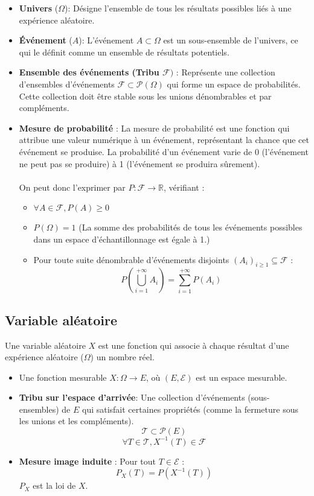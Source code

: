 \documentclass{article}
\begin{document}
\begin{itemize}
    \item \textbf{Univers} ($\Omega$): Désigne l'ensemble de tous les résultats possibles liés à une expérience aléatoire.
    \item \textbf{Événement} ($A$): L'événement $A \subset \Omega $ est un sous-ensemble de l'univers, ce qui le définit comme un ensemble de résultats potentiels.
    \item \textbf{Ensemble des événements (Tribu $\mathcal{F})$} : Représente une collection d'ensembles d'événements $ \mathcal{F} \subset \mathcal{P}(\Omega) $ qui forme un espace de probabilités. Cette collection doit être stable sous les unions dénombrables et par compléments.
    \item \textbf{Mesure de probabilité} : La mesure de probabilité est une fonction qui attribue une valeur numérique à un événement, représentant la chance que cet événement se produise. La probabilité d'un événement varie de 0 (l'événement ne peut pas se produire) à 1 (l'événement se produira sûrement). \\ \\
    On peut donc l'exprimer par $P : \mathcal{F} \rightarrow \mathbb{R}$, vérifiant :
    \begin{itemize}
        \item $ \forall A \in \mathcal{F}, P(A) \geq 0 $
        \item $P(\Omega) = 1$ (La somme des probabilités de tous les événements possibles dans un espace d'échantillonnage est égale à 1.)
        \item Pour toute suite dénombrable d'événements disjoints $(A_i)_{i \geq 1} \subseteq \mathcal{F}$ :
        \[
        P\left( \bigcup_{i=1}^{+\infty} A_i \right) = \sum_{i=1}^{+\infty} P(A_i)
        \]
    \end{itemize}
\end{itemize}

\subsection{Variable aléatoire}

Une variable aléatoire $ X $ est une fonction qui associe à chaque résultat d'une expérience aléatoire ($\Omega$) un nombre réel.

\begin{itemize}
    \item Une fonction mesurable $X : \Omega \rightarrow E$, où $(E, \mathcal{E})$ est un espace mesurable.
    \item \textbf{Tribu sur l'espace d'arrivée}: Une collection d'événements (sous-ensembles) de $E$ qui satisfait certaines propriétés (comme la fermeture sous les unions et les compléments). 
    \[
    \mathcal{T} \subset \mathcal{P}(E)
    \]
    \[
    \forall T \in \mathcal{T}, X^{-1}(T) \in \mathcal{F}
    \]
    \item \textbf{Mesure image induite} : Pour tout $T \in \mathcal{E}$ :
    \[
    P_X(T) = P(X^{-1}(T))
    \]
    $P_X$ est la loi de $X$.
\end{itemize}
\end{document}
